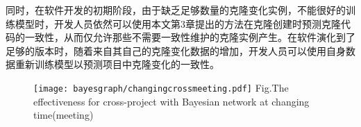 同时，在软件开发的初期阶段，由于缺乏足够数量的克隆变化实例，不能很好的训练模型时，开发人员依然可以使用本文第3章提出的方法在克隆创建时预测克隆代码的一致性，从而仅允许那些不需要一致性维护的克隆实例产生。在软件演化到了足够的版本时，随着来自其自己的克隆变化数据的增加，开发人员可以使用自身数据重新训练模型以预测项目中克隆变化的一致性。


\begin{figure}[htbp]
\centering
\texttt{[image: bayesgraph/changingcrossmeeting.pdf]}
{Fig.$\!$}{The effectiveness for cross-project with Bayesian network at changing time(meeting)}
\vspace{-1em}
\end{figure}

